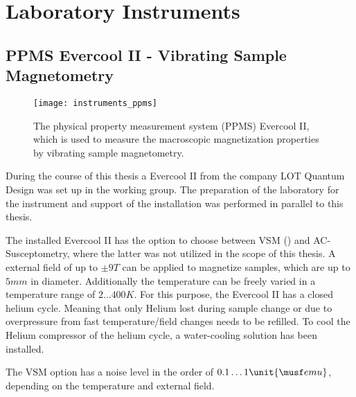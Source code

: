 \documentclass[\main/dresen_thesis.tex]{subfiles}
\begin{document}
\chapter{Laboratory Instruments}
  \section{PPMS Evercool II - Vibrating Sample Magnetometry}
  \label{app:additionalExperimentalTechniques:vsm}
    \begin{figure}[ht]
      \centering
      \texttt{[image: instruments\_ppms]}
      \caption{\label{fig:appendix:instruments:ppms}The physical property measurement system (PPMS) Evercool II, which is used to measure the macroscopic magnetization properties by vibrating sample magnetometry.}
    \end{figure}
    During the course of this thesis a Evercool II from the company LOT Quantum Design was set up in the working group.
    The preparation of the laboratory for the instrument and support of the installation was performed in parallel to this thesis.

    The installed Evercool II has the option to choose between VSM () and AC-Susceptometry, where the latter was not utilized in the scope of this thesis.
    A external field of up to $\pm 9 \unit{T}$ can be applied to magnetize samples, which are up to $5 \unit{mm}$ in diameter.
    Additionally the temperature can be freely varied in a temperature range of $2 \ldots 400 \unit{K}$.
    For this purpose, the Evercool II has a closed helium cycle.
    Meaning that only Helium lost during sample change or due to overpressure from fast temperature/field changes needs to be refilled.
    To cool the Helium compressor of the helium cycle, a water-cooling solution has been installed.

    The VSM option has a noise level in the order of $0.1 \ldots 1 \unit{\musf emu}$, depending on the temperature and external field.
\end{document}
